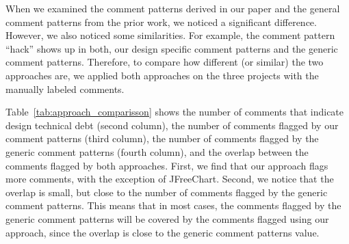 When we examined the comment patterns derived in our paper and the general comment patterns from the prior work, we noticed a significant difference. However, we also noticed some similarities. For example, the comment pattern ``hack'' shows up in both, our design specific comment patterns and the generic comment patterns. Therefore, to compare how different (or similar) the two approaches are, we applied both approaches on the three projects with the manually labeled comments.

Table~\ref{tab:approach_comparisson} shows the number of comments that indicate design technical debt (second column), the number of comments flagged by our comment patterns (third column), the number of comments flagged by the generic comment patterns (fourth column), and the overlap between the comments flagged by both approaches. First, we find that our approach flags more \SADTD comments, with the exception of JFreeChart. Second, we notice that the overlap is small, but close to the number of comments flagged by the generic comment patterns. This means that in most cases, the comments flagged by the generic comment patterns will be covered by the comments flagged using our approach, since the overlap is close to the generic comment patterns value.




